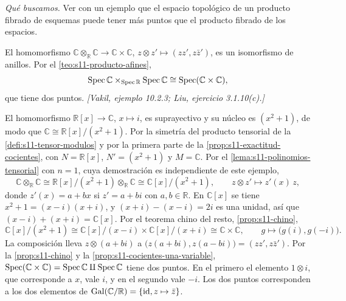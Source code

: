 \emph{Qué buscamos.} Ver con un ejemplo que el espacio topológico de un producto fibrado de esquemas puede tener más puntos que el producto fibrado de los espacios.

\begin{ejem}
\label{ejem:s11-c-tensor-c}
El homomorfismo \(\mathbb C\otimes_{\mathbb R}\mathbb C\to\mathbb C\times\mathbb C\), \(z\otimes z'\mapsto(z z',z\bar z')\), es un isomorfismo de anillos. Por el \cref{teo:s11-producto-afines},
\[
 \operatorname{Spec}\mathbb C\times_{\operatorname{Spec}\mathbb R}\operatorname{Spec}\mathbb C\cong\operatorname{Spec}(\mathbb C\times\mathbb C),
\]
que tiene dos puntos. \emph{[Vakil, ejemplo 10.2.3; Liu, ejercicio 3.1.10(c).]}
\end{ejem}

El homomorfismo \(\mathbb R[x]\to\mathbb C\), \(x\mapsto i\), es suprayectivo y su núcleo es \((x^2+1)\), de modo que \(\mathbb C\cong\mathbb R[x]/(x^2+1)\). Por la simetría del producto tensorial de la \cref{defi:s11-tensor-modulos} y por la primera parte de la \cref{prop:s11-exactitud-cocientes}, con \(N=\mathbb R[x]\), \(N'=(x^2+1)\) y \(M=\mathbb C\). Por el \cref{lema:s11-polinomios-tensorial} con \(n=1\), cuya demostración es independiente de este ejemplo,
\[
 \mathbb C\otimes_{\mathbb R}\mathbb C\cong\mathbb R[x]/(x^2+1)\otimes_{\mathbb R}\mathbb C
 \cong\mathbb C[x]/(x^2+1),\qquad z\otimes z'\longmapsto z'(x)\,z,
\]
donde \(z'(x)=a+bx\) si \(z'=a+bi\) con \(a,b\in\mathbb R\). En \(\mathbb C[x]\) se tiene \(x^2+1=(x-i)(x+i)\), y \((x+i)-(x-i)=2i\) es una unidad, así que \((x-i)+(x+i)=\mathbb C[x]\). Por el teorema chino del resto, \cref{prop:s11-chino},
\[
 \mathbb C[x]/(x^2+1)\cong\mathbb C[x]/(x-i)\times\mathbb C[x]/(x+i)\cong\mathbb C\times\mathbb C,
 \qquad g\longmapsto\bigl(g(i),g(-i)\bigr).
\]
La composición lleva \(z\otimes(a+bi)\) a \(\bigl(z(a+bi),z(a-bi)\bigr)=(zz',z\bar z')\). Por la \cref{prop:s11-chino} y la \cref{prop:s11-cocientes-una-variable}, \(\operatorname{Spec}(\mathbb C\times\mathbb C)=\operatorname{Spec}\mathbb C\amalg\operatorname{Spec}\mathbb C\) tiene dos puntos. En el primero el elemento \(1\otimes i\), que corresponde a \(x\), vale \(i\), y en el segundo vale \(-i\). Los dos puntos corresponden a los dos elementos de \(\operatorname{Gal}(\mathbb C/\mathbb R)=\{\operatorname{id},z\mapsto\bar z\}\).

